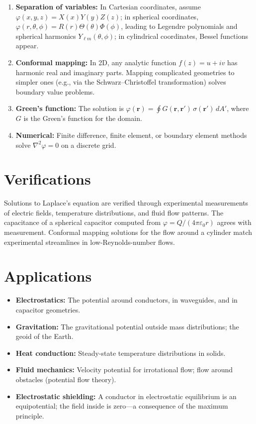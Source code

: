 \documentclass[11pt,openright]{book}
\begin{document}
\begin{enumerate}
  \item \textbf{Separation of variables:} In Cartesian coordinates, assume $\varphi(x,y,z) = X(x)Y(y)Z(z)$; in spherical coordinates, $\varphi(r,\theta,\phi) = R(r)\Theta(\theta)\Phi(\phi)$, leading to Legendre polynomials and spherical harmonics $Y_{\ell m}(\theta,\phi)$; in cylindrical coordinates, Bessel functions appear.
  \item \textbf{Conformal mapping:} In 2D, any analytic function $f(z) = u + iv$ has harmonic real and imaginary parts. Mapping complicated geometries to simpler ones (e.g., via the Schwarz--Christoffel transformation) solves boundary value problems.
  \item \textbf{Green's function:} The solution is $\varphi(\mathbf{r}) = \oint G(\mathbf{r},\mathbf{r}')\,\sigma(\mathbf{r}')\,dA'$, where $G$ is the Green's function for the domain.
  \item \textbf{Numerical:} Finite difference, finite element, or boundary element methods solve $\nabla^{2}\varphi = 0$ on a discrete grid.
\end{enumerate}
\section*{Verifications}

Solutions to Laplace's equation are verified through experimental measurements of electric fields, temperature distributions, and fluid flow patterns. The capacitance of a spherical capacitor computed from $\varphi = Q/(4\pi\varepsilon_{0}r)$ agrees with measurement. Conformal mapping solutions for the flow around a cylinder match experimental streamlines in low-Reynolds-number flows.
\section*{Applications}

\begin{itemize}
  \item \textbf{Electrostatics:} The potential around conductors, in waveguides, and in capacitor geometries.
  \item \textbf{Gravitation:} The gravitational potential outside mass distributions; the geoid of the Earth.
  \item \textbf{Heat conduction:} Steady-state temperature distributions in solids.
  \item \textbf{Fluid mechanics:} Velocity potential for irrotational flow; flow around obstacles (potential flow theory).
  \item \textbf{Electrostatic shielding:} A conductor in electrostatic equilibrium is an equipotential; the field inside is zero---a consequence of the maximum principle.
\end{itemize}
\end{document}
